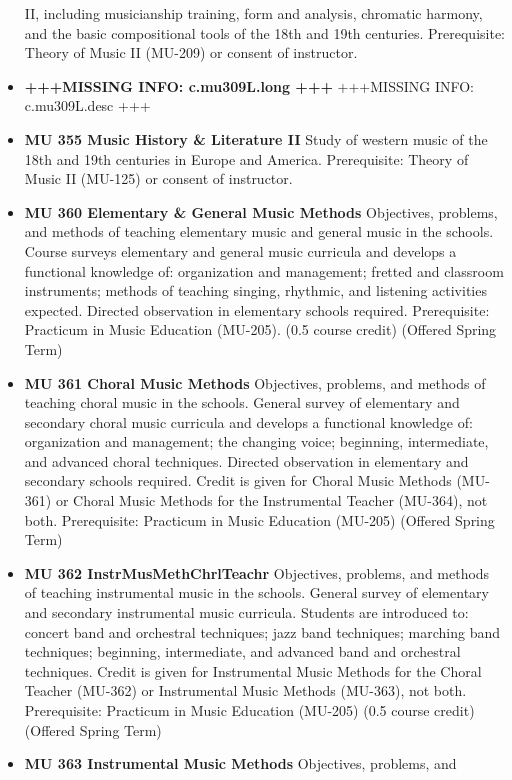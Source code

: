 \documentclass[
  letterpaper,
]{scrbook}
\begin{document}
\begin{itemize}
  II, including musicianship training, form and analysis, chromatic
  harmony, and the basic compositional tools of the 18th and 19th
  centuries. Prerequisite: Theory of Music II (MU-209) or consent of
  instructor.
\item
  \textbf{+++MISSING INFO: c.mu309L.long +++} +++MISSING INFO:
  c.mu309L.desc +++
\item
  \textbf{MU 355 Music History \& Literature II} Study of western music
  of the 18th and 19th centuries in Europe and America. Prerequisite:
  Theory of Music II (MU-125) or consent of instructor.
\item
  \textbf{MU 360 Elementary \& General Music Methods} Objectives,
  problems, and methods of teaching elementary music and general music
  in the schools. Course surveys elementary and general music curricula
  and develops a functional knowledge of: organization and management;
  fretted and classroom instruments; methods of teaching singing,
  rhythmic, and listening activities expected. Directed observation in
  elementary schools required. Prerequisite: Practicum in Music
  Education (MU-205). (0.5 course credit) (Offered Spring Term)
\item
  \textbf{MU 361 Choral Music Methods} Objectives, problems, and methods
  of teaching choral music in the schools. General survey of elementary
  and secondary choral music curricula and develops a functional
  knowledge of: organization and management; the changing voice;
  beginning, intermediate, and advanced choral techniques. Directed
  observation in elementary and secondary schools required. Credit is
  given for Choral Music Methods (MU-361) or Choral Music Methods for
  the Instrumental Teacher (MU-364), not both. Prerequisite: Practicum
  in Music Education (MU-205) (Offered Spring Term)
\item
  \textbf{MU 362 InstrMusMethChrlTeachr} Objectives, problems, and
  methods of teaching instrumental music in the schools. General survey
  of elementary and secondary instrumental music curricula. Students are
  introduced to: concert band and orchestral techniques; jazz band
  techniques; marching band techniques; beginning, intermediate, and
  advanced band and orchestral techniques. Credit is given for
  Instrumental Music Methods for the Choral Teacher (MU-362) or
  Instrumental Music Methods (MU-363), not both. Prerequisite: Practicum
  in Music Education (MU-205) (0.5 course credit) (Offered Spring Term)
\item
  \textbf{MU 363 Instrumental Music Methods} Objectives, problems, and

\end{itemize}
\end{document}
